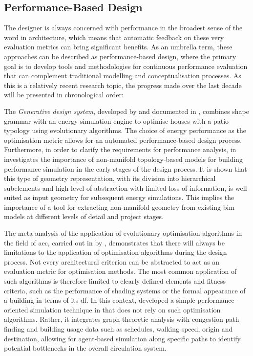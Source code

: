 \documentclass[a4paper, 12pt]{report}
\begin{document}
\subsection{Performance-Based Design}\label{subsec:performance-based-design}

The designer is always concerned with performance in the broadest sense of the word in architecture, which means that automatic feedback on these very evaluation metrics can bring significant benefits. As an umbrella term, these approaches can be described as performance-based design, where the primary goal is to develop tools and methodologies for continuous performance evaluation that can complement traditional modelling and conceptualisation processes. As this is a relatively recent research topic, the progress made over the last decade will be presented in chronological order:

The \textit{Generative design system}, developed by \citeauthor{caldas2012generation} and documented in , combines shape grammar with an energy simulation engine to optimise houses with a patio typology using evolutionary algorithms. The choice of energy performance as the optimisation metric allows for an automated performance-based design process. Furthermore, in order to clarify the requirements for performance analysis, \citeauthor{jabi2015potential} in \citeyear{jabi2015potential} investigates the importance of non-\gls{manifold} topology-based models for building performance simulation in the early stages of the design process. It is shown that this type of geometry representation, with its division into hierarchical subelements and high level of abstraction with limited loss of information, is well suited as input geometry for subsequent energy simulations. This implies the importance of a tool for extracting non-\gls{manifold} geometry from existing \acrshort{bim} models at different levels of detail and project stages.

The meta-analysis of the application of evolutionary optimisation algorithms in the field of \acrshort{aec}, carried out in \citeyear{canestrino2021influence} by \citeauthor{canestrino2021influence}, demonstrates that there will always be limitations to the application of optimisation algorithms during the design process. Not every architectural criterion can be abstracted to act as an evaluation metric for optimisation methods. The most common application of such algorithms is therefore limited to clearly defined elements and fitness criteria, such as the performance of shading systems or the formal appearance of a building in terms of its \acrlong{df}. In this context, \citeauthor{rogers2022running} developed a simple performance-oriented simulation technique in \citeyear{rogers2022running} that does not rely on such optimisation algorithms. Rather, it integrates graph-theoretic analysis with congestion path finding and building usage data such as schedules, walking speed, origin and destination, allowing for agent-based simulation along specific paths to identify potential bottlenecks in the overall circulation system.
\end{document}
